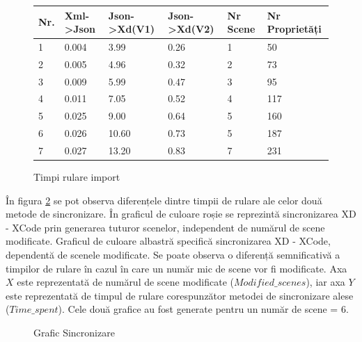 \begin{figure}[!htbp]
\centering
\begin{center}
    \begin{tabular}{| l | l | l | l |l |l |}
    \hline
    Nr. & Xml->Json & Json->Xd(V1) & Json->Xd(V2) & Nr Scene & Nr Proprietăți\\ \hline
    1 & 0.004 & 3.99 & 0.26 & 1 & 50\\ \hline
    2 & 0.005 & 4.96 & 0.32 & 2 & 73\\ \hline
    3 & 0.009 & 5.99 & 0.47 & 3 & 95\\ \hline
    4 & 0.011 & 7.05 & 0.52 & 4 & 117\\ \hline
    5 & 0.025 & 9.00 & 0.64 & 5 & 160\\ \hline
    6 & 0.026 & 10.60 & 0.73 & 5 & 187\\ \hline
    7 & 0.027 & 13.20 & 0.83 & 7 & 231\\ \hline
    \end{tabular}
\end{center}
\caption{Timpi rulare import} \label{fig:Tabimport}
\end{figure}

În figura \ref{fig:GraficSinc2} se pot observa diferențele dintre timpii de rulare ale celor două metode de sincronizare. În graficul de culoare roșie se reprezintă sincronizarea XD - XCode prin generarea tuturor scenelor, independent de numărul de scene modificate. Graficul de culoare albastră specifică sincronizarea XD - XCode, dependentă de scenele modificate. Se poate observa o diferență semnificativă a timpilor de rulare în cazul în care un număr mic de scene vor fi modificate. Axa $X$ este reprezentată de numărul de scene modificate ($Modified\_scenes$), iar axa $Y$ este reprezentată de timpul de rulare corespunzător metodei de sincronizare alese ($Time\_spent$). Cele două grafice au fost generate pentru un număr de scene = 6.

\begin{figure}[!htbp]
\centering
{}
\caption{Grafic Sincronizare} \label{fig:GraficSinc2}
\end{figure}

